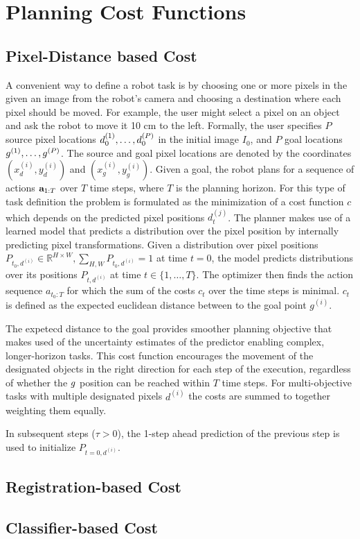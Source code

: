 \section{Planning Cost Functions}


\subsection{Pixel-Distance based Cost}
A convenient way to define a robot task is by choosing one or more pixels in the given an image from the robot's camera and choosing a destination where each pixel should be moved. For example, the user might select a pixel on an object and ask the robot to move it 10 cm to the left. Formally, the user specifies $P$ source pixel locations $d_0^{(1)}, \dots, d_0^{(P)}$ in the initial image $I_0$, and $P$ goal locations $g^{(1)}, \dots, g^{(P)}$. The source and goal pixel locations are denoted by the coordinates $(x_d^{(i)}, y_d^{(i)})$ and $(x_g^{(i)}, y_g^{(i)})$. Given a goal, the robot plans for a sequence of actions $\mathbf{a}_{1:T}$ over $T$ time steps, where $T$ is the planning horizon. For this type of task definition the problem is formulated as the minimization of a cost function $c$ which depends on the predicted pixel positions $d_t^{(j)}$. The planner makes use of a learned model that predicts a distribution over the pixel position by internally predicting pixel transformations. Given a distribution over pixel positions $P_{t_0, d^{(i)}}\in\mathbb{R}^{H\times W}, \sum_{H,W} P_{t_0, d^{(i)}} = 1$ at time $t = 0$, the model predicts distributions over its positions $P_{t, d^{(i)}}$ at time $t \in \{ 1, \dots, T \}$. The optimizer then finds the action sequence $a_{t_0:T}$ for which the sum of the costs $c_t$ over the time steps is minimal. $c_t$ is defined as the expected euclidean distance between to the goal point $g^{(i)}$.

The expetecd distance to the goal provides smoother planning objective that makes used of the uncertainty estimates of the predictor enabling complex, longer-horizon tasks. This cost function encourages the movement of the designated objects in the right direction for each step of the execution, regardless of whether the $g$ position can be reached within $T$ time steps. For multi-objective tasks with multiple designated pixels $d^{(i)}$ the costs are summed to together weighting them equally.



In subsequent steps ($\tau > 0$), the 1-step ahead prediction of the previous step is used to initialize $P_{t=0,d^{(i)}}$. 

\subsection{Registration-based Cost}



\subsection{Classifier-based Cost}
\label{subsec:class_cost}


